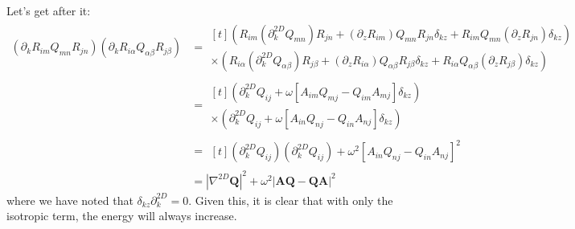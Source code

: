 \documentclass[reqno]{article}
\newcommand{\Q}{\mathbf{Q}}
\newcommand{\A}{\mathbf{A}}
\begin{document}
Let's get after it:
\begin{equation}
\begin{split}
    \left( \partial_k R_{im} Q_{mn} R_{jn} \right)
    \left( \partial_k R_{i\alpha} Q_{\alpha \beta} R_{j\beta} \right)
    &=
    \begin{multlined}[t]
    \left( 
        R_{im} (\partial^{2D}_k Q_{m n}) R_{jn} 
        + (\partial_z R_{im}) Q_{m n} R_{jn} \delta_{kz}
        + R_{im} Q_{m n} (\partial_z R_{jn}) \delta_{kz}
    \right) \\
    \times
    \left( 
        R_{i\alpha} (\partial^{2D}_k Q_{\alpha \beta}) R_{j\beta} 
        + (\partial_z R_{i\alpha}) Q_{\alpha \beta} R_{j\beta} \delta_{kz}
        + R_{i\alpha} Q_{\alpha \beta} (\partial_z R_{j\beta}) \delta_{kz}
    \right)
    \end{multlined} \\
    &=
    \begin{multlined}[t]
    \left( 
        \partial^{2D}_k Q_{i j}
        + \omega \left[ A_{im} Q_{m j} - Q_{im} A_{mj} \right] \delta_{kz}
    \right) \\
    \times
    \left( 
        \partial^{2D}_k Q_{i j}
        + \omega \left[ A_{in} Q_{n j} - Q_{in} A_{nj} \right] \delta_{kz}
    \right)
    \end{multlined} \\
    &=
    \begin{multlined}[t]
        \left( \partial^{2D}_k Q_{ij} \right)\left( \partial^{2D}_k Q_{ij} \right)
        + \omega^2\left[ A_{in} Q_{n j} - Q_{in} A_{nj} \right]^2 
    \end{multlined} \\
    &=
    \left| \nabla^{2D} \Q \right|^2
    + \omega^2 \left| \A \Q - \Q \A \right|^2
\end{split}
\end{equation}
where we have noted that $\delta_{kz} \partial^{2D}_k = 0$.
Given this, it is clear that with only the isotropic term, the energy will always increase.
\end{document}
